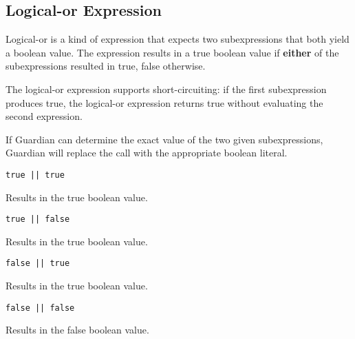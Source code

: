 
\subsection{Logical-or Expression}
{
	Logical-or is a kind of expression that expects two subexpressions that
	both yield a boolean value. The expression results in a true boolean value
	if \textbf{either} of the subexpressions resulted in true, false otherwise.
	
	The logical-or expression supports short-circuiting: if the first
	subexpression produces true, the logical-or expression returns true
	without evaluating the second expression.
	
	If Guardian can determine the exact value of the two given subexpressions,
	Guardian will replace the call with the appropriate boolean literal.
	
	\begin{itemize}
	{
		\item[] \texttt{true || true}
		
			Results in the true boolean value.
			
		\item[] \texttt{true || false}
		
			Results in the true boolean value.
			
		\item[] \texttt{false || true}
		
			Results in the true boolean value.
			
		\item[] \texttt{false || false}
		
			Results in the false boolean value.
	}
	\end{itemize}
}
